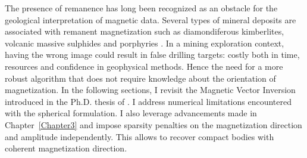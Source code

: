 The presence of remanence has long been recognized as an obstacle for the geological interpretation of magnetic data.
Several types of mineral deposits are associated with remanent magnetization such as diamondiferous kimberlites, volcanic massive sulphides and porphyries \cite[]{Henkel1991, Enkin2014}.
In a mining exploration context, having the wrong image could result in false drilling targets: costly both in time, resources and confidence in geophysical methods.
Hence the need for a more robust algorithm that does not require knowledge about the orientation of magnetization.
In the following sections, I revisit the Magnetic Vector Inversion introduced in the Ph.D. thesis of \cite{PhDLelievre09}. I address numerical limitations encountered with the spherical formulation. I also leverage advancements made in Chapter~\ref{Chapter3} and impose sparsity penalties on the magnetization direction and amplitude independently. This allows to recover compact bodies with coherent magnetization direction.


